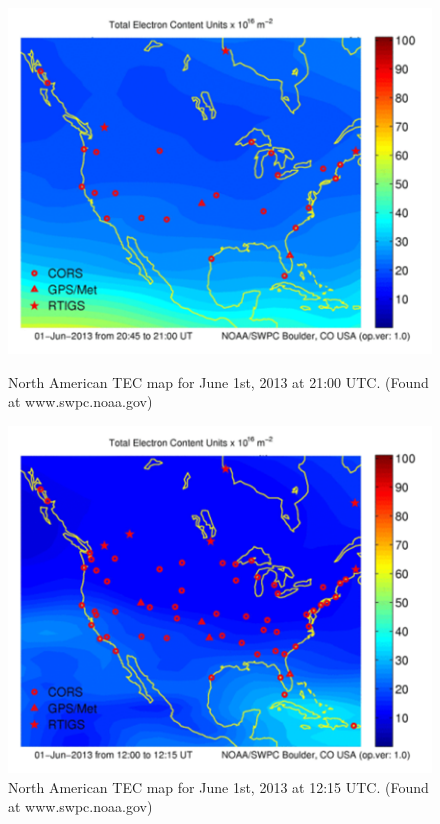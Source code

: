 \begin{figure}[htb]
\centering
\begin{minipage}[b]{0.48\textwidth}
\centering
\includegraphics[width=0.95\linewidth]{Ionosphere/figures/NA_TEC_day.png}
\caption{North American TEC map for June 1st, 2013 at 21:00 UTC. (Found at www.swpc.noaa.gov)   }
\label{Fig:day_TEC_NA}
\end{minipage}%
\begin{minipage}[b]{0.02\textwidth}
\hspace{1cm}
\end{minipage}%
\begin{minipage}[b]{0.48\textwidth}
\centering
\includegraphics[width=0.95\linewidth]{Ionosphere/figures/NA_TEC_night.png}
\caption{North American TEC map for June 1st, 2013 at 12:15 UTC. (Found at www.swpc.noaa.gov) }
\label{Fig:night_TEC_NA}
\end{minipage}
\end{figure}


